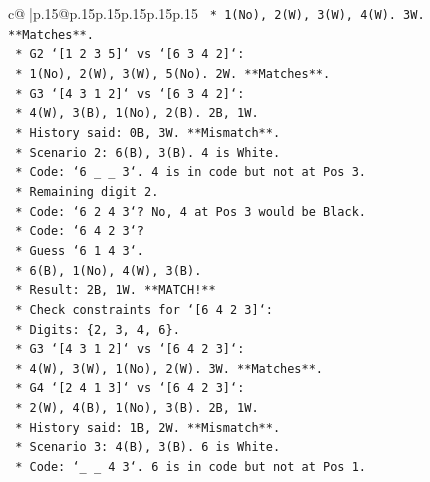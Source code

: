 \documentclass{article}
\begin{document}
{\begin{supertabular}{c@{$\;$}|p{.15\linewidth}@{}p{.15\linewidth}p{.15\linewidth}p{.15\linewidth}p{.15\linewidth}p{.15\linewidth}}
{{{\texttt{                            *   1(No), 2(W), 3(W), 4(W). 3W. **Matches**.} \\
\texttt{                        *   G2 `{[}1 2 3 5{]}` vs `{[}6 3 4 2{]}`:} \\
\texttt{                            *   1(No), 2(W), 3(W), 5(No). 2W. **Matches**.} \\
\texttt{                        *   G3 `{[}4 3 1 2{]}` vs `{[}6 3 4 2{]}`:} \\
\texttt{                            *   4(W), 3(B), 1(No), 2(B). 2B, 1W.} \\
\texttt{                            *   History said: 0B, 3W. **Mismatch**.} \\
\texttt{                *   Scenario 2: 6(B), 3(B). 4 is White.} \\
\texttt{                    *   Code: `6 \_ \_ 3`. 4 is in code but not at Pos 3.} \\
\texttt{                    *   Remaining digit 2.} \\
\texttt{                    *   Code: `6 2 4 3`? No, 4 at Pos 3 would be Black.} \\
\texttt{                    *   Code: `6 4 2 3`?} \\
\texttt{                        *   Guess `6 1 4 3`.} \\
\texttt{                        *   6(B), 1(No), 4(W), 3(B).} \\
\texttt{                        *   Result: 2B, 1W. **MATCH!**} \\
\texttt{                    *   Check constraints for `{[}6 4 2 3{]}`:} \\
\texttt{                        *   Digits: \{2, 3, 4, 6\}.} \\
\texttt{                        *   G3 `{[}4 3 1 2{]}` vs `{[}6 4 2 3{]}`:} \\
\texttt{                            *   4(W), 3(W), 1(No), 2(W). 3W. **Matches**.} \\
\texttt{                        *   G4 `{[}2 4 1 3{]}` vs `{[}6 4 2 3{]}`:} \\
\texttt{                            *   2(W), 4(B), 1(No), 3(B). 2B, 1W.} \\
\texttt{                            *   History said: 1B, 2W. **Mismatch**.} \\
\texttt{                *   Scenario 3: 4(B), 3(B). 6 is White.} \\
\texttt{                    *   Code: `\_ \_ 4 3`. 6 is in code but not at Pos 1.} \\
}}}
\end{supertabular}}
\end{document}
